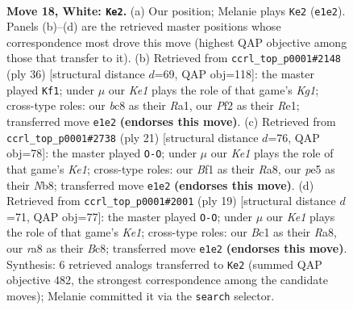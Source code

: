 \documentclass[11pt]{article}
\begin{document}
\clearpage

\begin{figure}[p]\centering
\begin{subfigure}{0.46\textwidth}\centering
\resizebox{\linewidth}{!}{%
\newchessgame
\chessboard[
  setfen={r1b1k2r/4bp2/5n2/p2pp1p1/3q3p/5Q1P/PP3PP1/RNB1KB1R w Qkq - 0 18},
  showmover=false,
  pgfstyle=straightmove, color=movearrow, markmove={e1-e2}
]}
\caption{}
\end{subfigure}\hfill
\begin{subfigure}{0.46\textwidth}\centering
\resizebox{\linewidth}{!}{%
\newchessgame
\chessboard[
  setfen={r3k2r/ppb2pp1/2pqp1n1/8/P2PQ2p/2PB3P/1P3PP1/R1B1R1K1 w kq - 1 19},
  showmover=false,
  pgfstyle=straightmove, color=movearrow, markmove={g1-f1}
]}
\caption{}
\end{subfigure}
\\[4pt]
\begin{subfigure}{0.46\textwidth}\centering
\resizebox{\linewidth}{!}{%
\newchessgame
\chessboard[
  setfen={rn2k2r/pb2qppp/1pp5/3p4/Q2P4/P3PN2/1P3PPP/R3KB1R b KQkq - 0 11},
  showmover=false,
  pgfstyle=straightmove, color=movearrow, markmove={e8-g8}
]}
\caption{}
\end{subfigure}\hfill
\begin{subfigure}{0.46\textwidth}\centering
\resizebox{\linewidth}{!}{%
\newchessgame
\chessboard[
  setfen={r1b1k2r/pppn1pp1/4pq1p/8/Q1BPP3/2P2N2/P4PPP/R3K2R b KQkq - 0 10},
  showmover=false,
  pgfstyle=straightmove, color=movearrow, markmove={e8-g8}
]}
\caption{}
\end{subfigure}
\caption{\textbf{Move 18, White: \texttt{Ke2}.} (a) Our position; Melanie plays \texttt{Ke2} (\texttt{e1e2}). Panels (b)--(d) are the retrieved master positions whose correspondence most drove this move (highest QAP objective among those that transfer to it). (b) Retrieved from \texttt{ccrl\_top\_p0001\#2148} (ply 36) [structural distance $d$=69, QAP obj=118]: the master played \texttt{Kf1}; under $\mu$ our \emph{Ke1} plays the role of that game's \emph{Kg1}; cross-type roles: our \emph{b}c8 as their \emph{R}a1, our \emph{P}f2 as their \emph{R}e1; transferred move \texttt{e1e2} \textbf{(endorses this move)}. (c) Retrieved from \texttt{ccrl\_top\_p0001\#2738} (ply 21) [structural distance $d$=76, QAP obj=78]: the master played \texttt{O-O}; under $\mu$ our \emph{Ke1} plays the role of that game's \emph{Ke1}; cross-type roles: our \emph{B}f1 as their \emph{R}a8, our \emph{p}e5 as their \emph{N}b8; transferred move \texttt{e1e2} \textbf{(endorses this move)}. (d) Retrieved from \texttt{ccrl\_top\_p0001\#2001} (ply 19) [structural distance $d$=71, QAP obj=77]: the master played \texttt{O-O}; under $\mu$ our \emph{Ke1} plays the role of that game's \emph{Ke1}; cross-type roles: our \emph{B}c1 as their \emph{R}a8, our \emph{r}a8 as their \emph{B}c8; transferred move \texttt{e1e2} \textbf{(endorses this move)}. Synthesis: 6 retrieved analogs transferred to \texttt{Ke2} (summed QAP objective 482, the strongest correspondence among the candidate moves); Melanie committed it via the \texttt{search} selector.}
\label{fig:thought-m34}
\end{figure}
\end{document}
